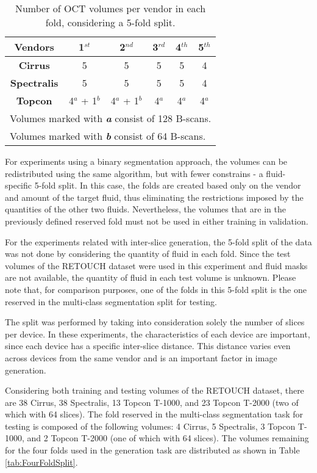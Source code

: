 \begin{table*}[!ht]
	\setlength{\tabcolsep}{6pt}
	\renewcommand{\arraystretch}{1.3}
	\caption{Number of OCT volumes per vendor in each fold, considering a 5-fold split.}
	\centering
	\begin{tabular}{|c|c|c|c|c|c|}
		\hline
		\textbf{Vendors} & \textbf{1$^{st}$} & \textbf{2$^{nd}$} & \textbf{3$^{rd}$} & \textbf{4$^{th}$} & \textbf{5$^{th}$} \\
		\hline
		\textbf{Cirrus} & 5 & 5 & 5 & 5 & 4 \\
		\textbf{Spectralis} & 5 & 5 & 5 & 5 & 4 \\
		\textbf{Topcon} & 4$^{a}$ + 1$^{b}$ & 4$^{a}$ + 1$^{b}$ & 4$^{a}$ & 4$^{a}$ & 4$^{a}$ \\
		\hline
		\multicolumn{6}{l}{Volumes marked with \textbf{\textit{a}} consist of 128 B-scans.} \\
		\multicolumn{6}{l}{Volumes marked with \textbf{\textit{b}} consist of 64 B-scans.} \\
	\end{tabular}
	\label{tab:FiveFoldSplit}
\end{table*}

For experiments using a binary segmentation approach, the volumes can be redistributed using the same algorithm, but with fewer constrains - a fluid-specific 5-fold split. In this case, the folds are created based only on the vendor and amount of the target fluid, thus eliminating the restrictions imposed by the quantities of the other two fluids. Nevertheless, the volumes that are in the previously defined reserved fold must not be used in either training in validation.
\par
For the experiments related with inter-slice generation, the 5-fold split of the data was not done by considering the quantity of fluid in each fold. Since the test volumes of the RETOUCH dataset were used in this experiment and fluid masks are not available, the quantity of fluid in each test volume is unknown. Please note that, for comparison purposes, one of the folds in this 5-fold split is the one reserved in the multi-class segmentation split for testing.
\par
The split was performed by taking into consideration solely the number of slices per device. In these experiments, the characteristics of each device are important, since each device has a specific inter-slice distance. This distance varies even across devices from the same vendor and is an important factor in image generation.
\par
Considering both training and testing volumes of the RETOUCH dataset, there are 38 Cirrus, 38 Spectralis, 13 Topcon T-1000, and 23 Topcon T-2000 (two of which with 64 slices). The fold reserved in the multi-class segmentation task for testing is composed of the following volumes: 4 Cirrus, 5 Spectralis, 3 Topcon T-1000, and 2 Topcon T-2000 (one of which with 64 slices). The volumes remaining for the four folds used in the generation task are distributed as shown in Table \ref{tab:FourFoldSplit}.

